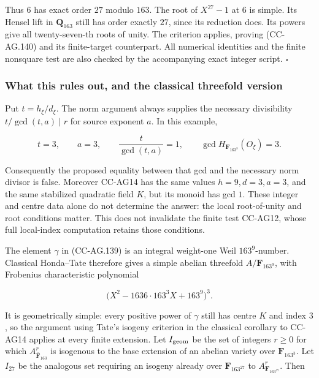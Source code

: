 Thus \(6\) has exact order \(27\) modulo \(163\). The root of
\(X^{27}-1\) at \(6\) is simple. Its Hensel lift in \(\mathbf Q_{163}\)
still has order exactly \(27\), since its reduction does. Its powers
give all twenty-seven-th roots of unity. The criterion applies, proving
(CC-AG.140) and its finite-target counterpart. All numerical identities
and the finite nonsquare test are also checked by the accompanying exact
integer script. \(\square\)

\subsubsection{What this rules out, and the classical threefold
version}\label{what-this-rules-out-and-the-classical-threefold-version}

Put \(t=h_\xi/d_\xi\). The norm argument always supplies the necessary
divisibility \(t/\gcd(t,a)\mid r\) for source exponent \(a\). In this
example,

\[
 t=3,\qquad a=3,\qquad
 \frac{t}{\gcd(t,a)}=1,\qquad
 \gcd H_{\mathbf F_{163^3}}(O_\xi)=3.
 \tag{CC-AG.145}
\]

Consequently the proposed equality between that gcd and the necessary
norm divisor is false. Moreover CC-AG14 has the same values
\(h=9,d=3,a=3\), and the same stabilized quadratic field \(K\), but its
monoid has gcd \(1\). These integer and centre data alone do not
determine the answer: the local root-of-unity and root conditions
matter. This does not invalidate the finite test CC-AG12, whose full
local-index computation retains those conditions.

The element \(\gamma\) in (CC-AG.139) is an integral weight-one Weil
\(163^9\)-number. Classical Honda--Tate therefore gives a simple abelian
threefold \(A/\mathbf F_{163^9}\), with Frobenius characteristic
polynomial

\[
 \bigl(X^2-1636\cdot163^3 X+163^9\bigr)^3.
 \tag{CC-AG.146}
\]

It is geometrically simple: every positive power of \(\gamma\) still has
centre \(K\) and index \(3\), so the argument using Tate's isogeny
criterion in the classical corollary to CC-AG14 applies at every finite
extension. Let \(I_{\rm geom}\) be the set of integers \(r\ge0\) for
which \(A_{\bar{\mathbf F}_{163}}^r\) is isogenous to the base extension
of an abelian variety over \(\mathbf F_{163^3}\). Let \(I_{27}\) be the
analogous set requiring an isogeny already over \(\mathbf F_{163^{27}}\)
to \(A_{\mathbf F_{163^{27}}}^r\). Then

